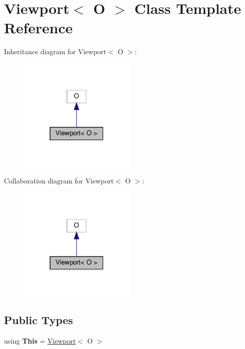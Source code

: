 \hypertarget{classViewport}{}\section{Viewport$<$ O $>$ Class Template Reference}
\label{classViewport}


Inheritance diagram for Viewport$<$ O $>$\+:\nopagebreak
\begin{figure}[H]
\begin{center}
\leavevmode
\includegraphics[width=160pt]{classViewport__inherit__graph}
\end{center}
\end{figure}


Collaboration diagram for Viewport$<$ O $>$\+:\nopagebreak
\begin{figure}[H]
\begin{center}
\leavevmode
\includegraphics[width=160pt]{classViewport__coll__graph}
\end{center}
\end{figure}
\subsection*{Public Types}
\begin{DoxyCompactItemize}
\item 
\mbox{\label{classViewport_ae2be70e231756012644499212454b87c}} 
using {\bfseries This} = \hyperlink{classViewport}{Viewport}$<$ O $>$
\end{DoxyCompactItemize}
